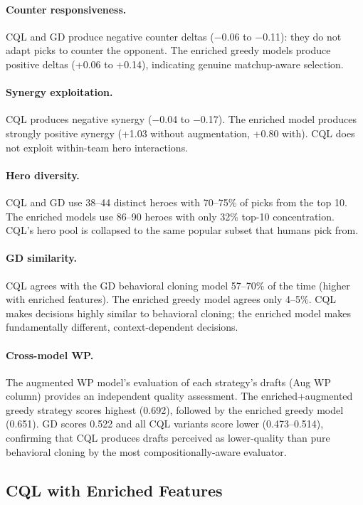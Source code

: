 \documentclass[journal]{IEEEtran}
\begin{document}
\paragraph{Counter responsiveness.} CQL and GD produce negative counter deltas ($-$0.06 to $-$0.11): they do not adapt picks to counter the opponent. The enriched greedy models produce positive deltas (+0.06 to +0.14), indicating genuine matchup-aware selection.

\paragraph{Synergy exploitation.} CQL produces negative synergy ($-$0.04 to $-$0.17). The enriched model produces strongly positive synergy (+1.03 without augmentation, +0.80 with). CQL does not exploit within-team hero interactions.

\paragraph{Hero diversity.} CQL and GD use 38--44 distinct heroes with 70--75\% of picks from the top 10. The enriched models use 86--90 heroes with only 32\% top-10 concentration. CQL's hero pool is collapsed to the same popular subset that humans pick from.

\paragraph{GD similarity.} CQL agrees with the GD behavioral cloning model 57--70\% of the time (higher with enriched features). The enriched greedy model agrees only 4--5\%. CQL makes decisions highly similar to behavioral cloning; the enriched model makes fundamentally different, context-dependent decisions.

\paragraph{Cross-model WP.} The augmented WP model's evaluation of each strategy's drafts (Aug WP column) provides an independent quality assessment. The enriched+augmented greedy strategy scores highest (0.692), followed by the enriched greedy model (0.651). GD scores 0.522 and all CQL variants score lower (0.473--0.514), confirming that CQL produces drafts perceived as lower-quality than pure behavioral cloning by the most compositionally-aware evaluator.

\subsection{CQL with Enriched Features}
\end{document}
